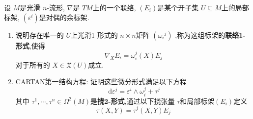 \documentclass[../../几何与拓扑.tex]{subfiles}
\begin{document}
    
\ifSubfilesClassLoaded{
    \frontmatter

    \tableofcontents
    
    \mainmatter
}{}

\begin{problemsec}
    
\end{problemsec}

\begin{problem}
    设 \(  M  \)是光滑 \(  n  \)-流形, \(   \nabla   \)是   \(  TM  \)上的一个联络, \(  \left( E_{i} \right)   \)是某个开子集 \(  U\subseteq M  \)上的局部标架, \(  \left(  \varepsilon ^{i} \right)   \)是对偶的余标架.
    \begin{enumerate}
        \item 说明存在唯一的  \(  U  \)上光滑1-形式的 \(  n\times n  \)矩阵 \(  \left( { \omega _{i}}^{j} \right)   \)   ,称为这组标架的\textbf{联络1-形式},使得 \[
         \nabla _{X}E_{i}=  \omega _{i}^{j}\left( X \right)E_{j} 
        \]对于所有的 \(  X \in \mathfrak{X}\left( U \right)   \)成立. 
        \item CARTAN第一结构方程: 证明这些微分形式满足以下方程 \[
        \,\mathrm{d}  \varepsilon ^{j}=  \varepsilon ^{i}\wedge  \omega _{i}^{j}+ \tau ^{j}
        \]其中 \(   \tau^1,\cdots,\tau^n \in  \Omega ^{2}\left( M \right)   \)是\textbf{挠2-形式},通过以下挠张量 \(  \tau   \)和局部标架\(  \left( E_{i} \right)   \)定义 \[
        \tau \left( X,Y \right)=  \tau ^{j}\left( X,Y \right)E_{j}  
        \]   

    \end{enumerate}
        
\end{problem}
\end{document}
